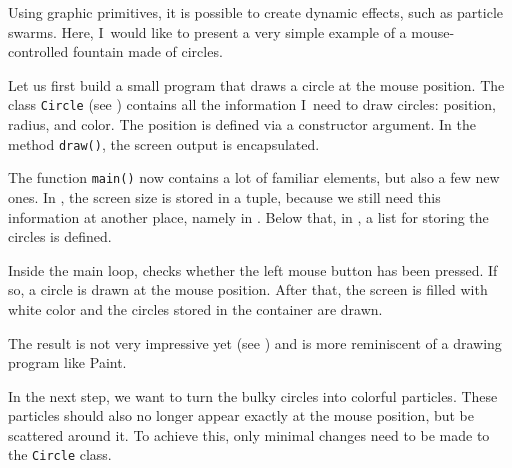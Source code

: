 \begin{figure}%
	\begin{center}%
		\vspace{-1cm}%
	\end{center}%
\end{figure}%
Using graphic primitives, it is possible to create dynamic effects, such as particle swarms. Here, I~would like to present a very simple example of a mouse-controlled fountain made of circles.

Let us first build a small program that draws a circle at the mouse position. The class \texttt{Circle} (see ) contains all the information I~need to draw circles: position, radius, and color. The position is defined via a constructor argument. In the method \texttt{draw()}, the screen output is encapsulated.

The function \texttt{main()} now contains a lot of familiar elements, but also a few new ones. In , the screen size is stored in a tuple, because we still need this information at another place, namely in . Below that, in , a list for storing the circles is defined.

Inside the main loop,  checks whether the left mouse button has been pressed. If so, a circle is drawn at the mouse position. After that, the screen is filled with white color and the circles stored in the container are drawn.

The result is not very impressive yet (see ) and is more reminiscent of a drawing program like Paint.


\begin{figure}%
	\begin{center}%
		\vspace{-1.5cm}%
	\end{center}%
\end{figure}%
In the next step, we want to turn the bulky circles into colorful particles. These particles should also no longer appear exactly at the mouse position, but be scattered around it. To achieve this, only minimal changes need to be made to the
\texttt{Circle} class. 

